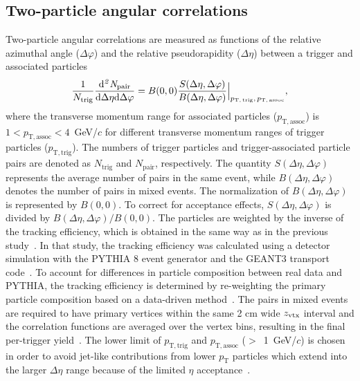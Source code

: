 \subsection{Two-particle angular correlations}
Two-particle angular correlations are measured as functions of the relative azimuthal angle ($\Delta\varphi$) and the relative pseudorapidity ($\Delta\eta$) between a trigger and associated particles
\begin{eqnarray}
\frac{1}{N_{\rm{trig}}} \frac{ \rm{d}\it{}^{2} N_{\rm{pair}} }{ \rm{d} \Delta\eta \rm{d}\Delta\varphi} = B(0, 0)\frac{S(\Delta\eta, \Delta\varphi)}{B(\Delta\eta, \Delta\varphi)}  \Big\lvert_{p_\mathrm{T,\,trig},\,p_\mathrm{T,\,assoc}},
\label{eq:corrfunction}
\end{eqnarray}
where the transverse momentum range for associated particles ($p_\mathrm{T,assoc}$) is $1<p_\mathrm{T,assoc}<4$~GeV/$c$ for different transverse momentum ranges of trigger particles ($p_\mathrm{T,trig}$).
The numbers of trigger particles and trigger-associated particle pairs are denoted as $N_\mathrm{trig}$ and $N_\mathrm{pair}$, respectively.
The quantity $S(\Delta\eta, \Delta\varphi)$ represents the average number of pairs in the same event, while $B(\Delta\eta, \Delta\varphi)$ denotes the number of pairs in mixed events. The normalization of $B(\Delta\eta, \Delta\varphi)$ is represented by $B(0,0)$. To correct for acceptance effects, $S(\Delta\eta, \Delta\varphi)$ is divided by $B(\Delta\eta, \Delta\varphi)/B(0,0)$. The particles are weighted by the inverse of the tracking efficiency, which is obtained in the same way as in the previous study~\cite{ALICE:2021nir}. In that study, the tracking efficiency was calculated using a detector simulation with the PYTHIA 8 event generator and the GEANT3 transport code~\cite{Brun:1994aa}. To account for differences in particle composition between real data and PYTHIA, the tracking efficiency is determined by re-weighting the primary particle composition based on a data-driven method~\cite{ALICE:2018hza, ALICE:2018vuu}.
The pairs in mixed events are required to have primary vertices within the same 2 cm wide $z_{\rm vtx}$ interval and the correlation functions are averaged over the vertex bins, resulting in the final per-trigger yield~\cite{Kopylov:1974th,Adam:2016tsv}. The lower limit of $p_\mathrm{T,trig}$ and $p_\mathrm{T,assoc}$ ($>$~1~GeV/$c$) is chosen in order to avoid jet-like contributions from lower $p_\mathrm{T}$ particles which extend into the larger $\Delta\eta$ range because of the limited $\eta$ acceptance~\cite{ALICE:2021nir}. 

